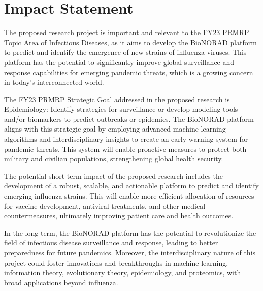 \documentclass[onecolumn, compsoc,12pt]{IEEEtran}
\begin{document}


\clearpage
{}
\section*{Impact Statement}

The proposed research project is important and relevant to the FY23 PRMRP Topic Area of Infectious Diseases, as it aims to develop the BioNORAD platform to predict and identify the emergence of new strains of influenza viruses. This platform has the potential to significantly improve global surveillance and response capabilities for emerging pandemic threats, which is a growing concern in today's interconnected world.

The FY23 PRMRP Strategic Goal addressed in the proposed research is Epidemiology: Identify strategies for surveillance or develop modeling tools and/or biomarkers to predict outbreaks or epidemics. The BioNORAD platform aligns with this strategic goal by employing advanced machine learning algorithms and interdisciplinary insights to create an early warning system for pandemic threats. This system will enable proactive measures to protect both military and civilian populations, strengthening global health security.

The potential short-term impact of the proposed research includes the development of a robust, scalable, and actionable platform to predict and identify emerging influenza strains. This will enable more efficient allocation of resources for vaccine development, antiviral treatments, and other medical countermeasures, ultimately improving patient care and health outcomes.

In the long-term, the BioNORAD platform has the potential to revolutionize the field of infectious disease surveillance and response, leading to better preparedness for future pandemics. Moreover, the interdisciplinary nature of this project could foster innovations and breakthroughs in machine learning, information theory, evolutionary theory, epidemiology, and proteomics, with broad applications beyond influenza.
\end{document}

